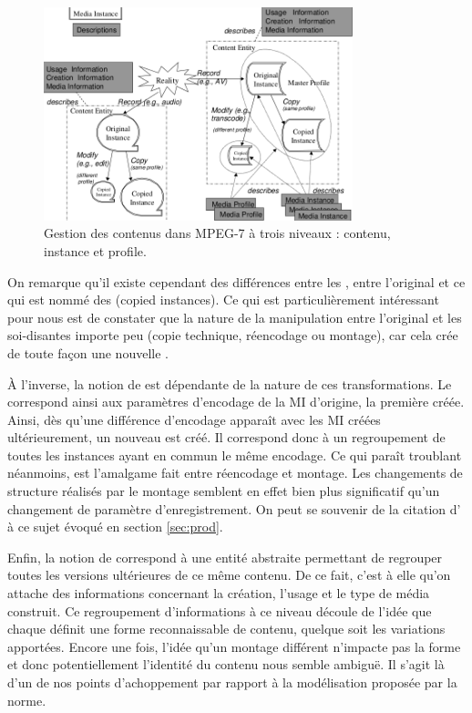 \begin{figure}[ht!]
\centering
\includegraphics[width=0.8\textwidth]{images/MPEG-7-MediaManagement.png}
\caption{Gestion des contenus dans MPEG-7 à trois niveaux : contenu, instance et profile.}
\label{img:soa:media}
\end{figure}


On remarque qu'il existe cependant des différences entre les , entre l'original et ce qui est nommé des  (copied instances). 
Ce qui est particulièrement intéressant pour nous est de constater que la nature de la manipulation entre l'original et les soi-disantes  importe peu (copie technique, réencodage ou montage), car cela crée de toute façon une nouvelle . 

À l'inverse, la notion de  est dépendante de la nature de ces transformations. 
Le  correspond ainsi aux paramètres d'encodage de la MI d'origine, la première créée. 
Ainsi, dès qu'une différence d'encodage apparaît avec les MI créées ultérieurement, un nouveau  est créé. 
Il correspond donc à un regroupement de toutes les instances ayant en commun le même encodage. 
Ce qui paraît troublant néanmoins, est l'amalgame fait entre réencodage et montage. 
Les changements de structure réalisés par le montage semblent en effet bien plus significatif qu'un changement de paramètre d'enregistrement. 
On peut se souvenir de la citation d' à ce sujet évoqué en section \ref{sec:prod}.

Enfin, la notion de  correspond à une entité abstraite permettant de regrouper toutes les versions ultérieures de ce même contenu.
De ce fait, c'est à elle qu'on attache des informations concernant la création, l'usage et le type de média construit. %
Ce regroupement d'informations à ce niveau découle de l'idée que chaque  définit une forme reconnaissable de contenu, quelque soit les variations apportées.
Encore une fois, l'idée qu'un montage différent n'impacte pas la forme et donc potentiellement l'identité du contenu nous semble ambiguë. 
Il s'agit là d'un de nos points d'achoppement par rapport à la modélisation proposée par la norme. 

